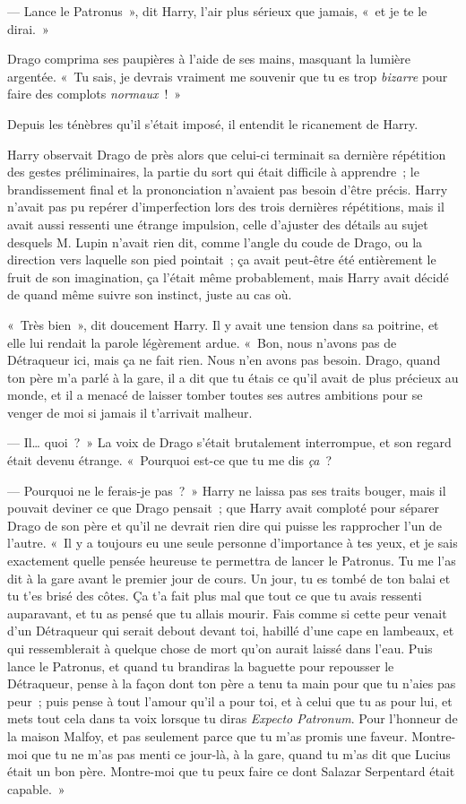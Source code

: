 --- Lance le Patronus~», dit Harry, l'air plus sérieux que jamais, «~et je te le dirai.~»

Drago comprima ses paupières à l'aide de ses mains, masquant la lumière argentée.
«~Tu sais, je devrais vraiment me souvenir que tu es trop \emph{bizarre} pour faire des complots \emph{normaux}~!~»

Depuis les ténèbres qu'il s'était imposé, il entendit le ricanement de Harry.

\later

Harry observait Drago de près alors que celui-ci terminait sa dernière répétition des gestes préliminaires, la partie du sort qui était difficile à apprendre~; le brandissement final et la prononciation n'avaient pas besoin d'être précis.
Harry n'avait pas pu repérer d'imperfection lors des trois dernières répétitions, mais il avait aussi ressenti une étrange impulsion, celle d'ajuster des détails au sujet desquels M. Lupin n'avait rien dit, comme l'angle du coude de Drago, ou la direction vers laquelle son pied pointait~; ça avait peut-être été entièrement le fruit de son imagination, ça l'était même probablement, mais Harry avait décidé de quand même suivre son instinct, juste au cas où.

«~Très bien~», dit doucement Harry.
Il y avait une tension dans sa poitrine, et elle lui rendait la parole légèrement ardue.
«~Bon, nous n'avons pas de Détraqueur ici, mais ça ne fait rien.
Nous n'en avons pas besoin.
Drago, quand ton père m'a parlé à la gare, il a dit que tu étais ce qu'il avait de plus précieux au monde, et il a menacé de laisser tomber toutes ses autres ambitions pour se venger de moi si jamais il t'arrivait malheur.

--- Il… quoi~?~»
La voix de Drago s'était brutalement interrompue, et son regard était devenu étrange.
«~Pourquoi est-ce que tu me dis \emph{ça}~?

--- Pourquoi ne le ferais-je pas~?~»
Harry ne laissa pas ses traits bouger, mais il pouvait deviner ce que Drago pensait~; que Harry avait comploté pour séparer Drago de son père et qu'il ne devrait rien dire qui puisse les rapprocher l'un de l'autre.
«~Il y a toujours eu une seule personne d'importance à tes yeux, et je sais exactement quelle pensée heureuse te permettra de lancer le Patronus.
Tu me l'as dit à la gare avant le premier jour de cours.
Un jour, tu es tombé de ton balai et tu t'es brisé des côtes.
Ça t'a fait plus mal que tout ce que tu avais ressenti auparavant, et tu as pensé que tu allais mourir.
Fais comme si cette peur venait d'un Détraqueur qui serait debout devant toi, habillé d'une cape en lambeaux, et qui ressemblerait à quelque chose de mort qu'on aurait laissé dans l'eau.
Puis lance le Patronus, et quand tu brandiras la baguette pour repousser le Détraqueur, pense à la façon dont ton père a tenu ta main pour que tu n'aies pas peur~; puis pense à tout l'amour qu'il a pour toi, et à celui que tu as pour lui, et mets tout cela dans ta voix lorsque tu diras \emph{Expecto Patronum}.
Pour l'honneur de la maison Malfoy, et pas seulement parce que tu m'as promis une faveur.
Montre-moi que tu ne m'as pas menti ce jour-là, à la gare, quand tu m'as dit que Lucius était un bon père.
Montre-moi que tu peux faire ce dont Salazar Serpentard était capable.~»


